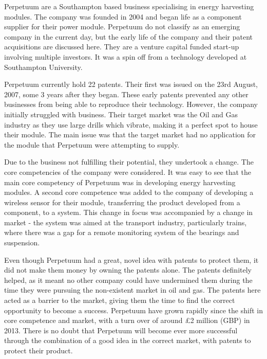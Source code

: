 {}


Perpetuum are a Southampton based business specialising in energy harvesting modules. 
The company was founded in 2004 and began life as a component supplier for their power module.
Perpetuum do not classify as an emerging company in the current day, but the early life of the company and their patent acquisitions are discussed here. 
They are a venture capital funded start-up involving multiple investors.
It was a spin off from a technology developed at Southampton University. 

Perpetuum currently hold 22 patents. 
Their first was issued on the 23rd August, 2007, some 3 years after they began.
These early patents prevented any other businesses from being able to reproduce their technology. 
However, the company initially struggled with business. %
Their target market was the Oil and Gas industry as they use large drills which vibrate, making it a perfect spot to house their module.
The main issue was that the target market had no application for the module that Perpetuum were attempting to supply. %

Due to the business not fulfilling their potential, they undertook a change. 
The core competencies of the company were considered.
It was easy to see that the main core competency of Perpetuum was in developing energy harvesting modules. 
A second core competence was added to the company of developing a wireless sensor for their module, transferring the product developed from a component, to a system.
This change in focus was accompanied by a change in market - the system was aimed at the transport industry, particularly trains, where there was a gap for a remote monitoring system of the bearings and suspension. 

Even though Perpetuum had a great, novel idea with patents to protect them, it did not make them money by owning the patents alone.
The patents definitely helped, as it meant no other company could have undermined them during the time they were pursuing the non-existent market in oil and gas.
The patents here acted as a barrier to the market, giving them the time to find the correct opportunity to become a success.
Perpetuum have grown rapidly since the shift in core competence and market, with a turn over of around \pounds 2 million (GBP) in 2013.
There is no doubt that Perpetuum will become ever more successful through the combination of a good idea in the correct market, with patents to protect their product. 

